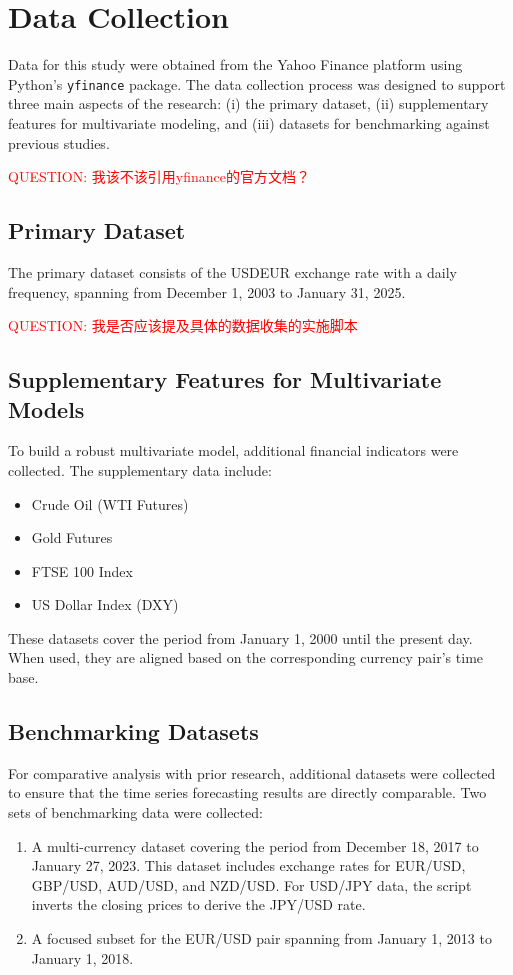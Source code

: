 \section{Data Collection}

Data for this study were obtained from the Yahoo Finance platform using Python’s \texttt{yfinance} package.
The data collection process was designed to support three main aspects of the research: (i) the primary dataset, (ii) supplementary features for multivariate modeling, and (iii) datasets for benchmarking against previous studies.

\textcolor{red}{QUESTION: 我该不该引用yfinance的官方文档？}
\subsection{Primary Dataset}
The primary dataset consists of the USDEUR exchange rate with a daily frequency, spanning from December 1, 2003 to January 31, 2025.

\textcolor{red}{QUESTION: 我是否应该提及具体的数据收集的实施脚本}


\subsection{Supplementary Features for Multivariate Models}
To build a robust multivariate model, additional financial indicators were collected.
The supplementary data include:
\begin{itemize}
    \item Crude Oil (WTI Futures)
    \item Gold Futures
    \item FTSE 100 Index
    \item US Dollar Index (DXY)
\end{itemize}
These datasets cover the period from January 1, 2000 until the present day.
When used, they are aligned based on the corresponding currency pair's time base.


\subsection{Benchmarking Datasets}
For comparative analysis with prior research, additional datasets were collected to ensure that the time series forecasting results are directly comparable. Two sets of benchmarking data were collected:
\begin{enumerate}
    \item A multi-currency dataset covering the period from December 18, 2017 to January 27, 2023. This dataset includes exchange rates for EUR/USD, GBP/USD, AUD/USD, and NZD/USD. For USD/JPY data, the script inverts the closing prices to derive the JPY/USD rate\cite{Garcia2023ComparisonRegression}.
    \item A focused subset for the EUR/USD pair spanning from January 1, 2013 to January 1, 2018\cite{Yildirim2021ComparisonClassification}.
\end{enumerate}
